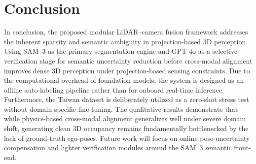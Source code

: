 \documentclass{IEEE_lsens/IEEE_lsens}
\begin{document}
\section{Conclusion}
In conclusion, the proposed modular LiDAR--camera fusion framework addresses the inherent sparsity and semantic ambiguity in projection-based 3D perception. Using SAM~3 as the primary segmentation engine and GPT-4o as a selective verification stage for semantic uncertainty reduction before cross-modal alignment improves dense 3D perception under projection-based sensing constraints. Due to the computational overhead of foundation models, the system is designed as an offline auto-labeling pipeline rather than for onboard real-time inference. Furthermore, the Taiwan dataset is deliberately utilized as a zero-shot stress test without domain-specific fine-tuning. The qualitative results demonstrate that while physics-based cross-modal alignment generalizes well under severe domain shift, generating clean 3D occupancy remains fundamentally bottlenecked by the lack of ground-truth ego-poses. Future work will focus on online pose-uncertainty compensation and lighter verification modules around the SAM~3 semantic front-end.
\end{document}
